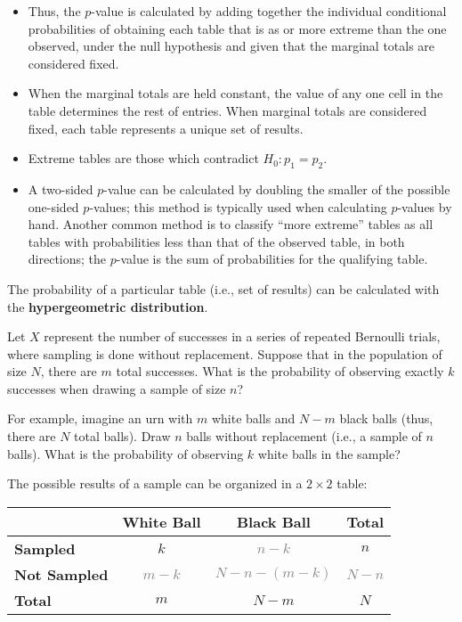 \documentclass[letterpaper,12pt,twoside,]{pinp}
\begin{document}
\begin{itemize}
\item
  Thus, the \(p\)-value is calculated by adding together the individual
  conditional probabilities of obtaining each table that is as or more
  extreme than the one observed, under the null hypothesis and given
  that the marginal totals are considered fixed.
\item
  When the marginal totals are held constant, the value of any one cell
  in the table determines the rest of entries. When marginal totals are
  considered fixed, each table represents a unique set of results.
\item
  Extreme tables are those which contradict \(H_0: p_1 = p_2\).
\item
  A two-sided \(p\)-value can be calculated by doubling the smaller of
  the possible one-sided \(p\)-values; this method is typically used
  when calculating \(p\)-values by hand. Another common method is to
  classify ``more extreme'' tables as all tables with probabilities less
  than that of the observed table, in both directions; the \(p\)-value
  is the sum of probabilities for the qualifying table.
\end{itemize}

The probability of a particular table (i.e., set of results) can be
calculated with the \textbf{hypergeometric distribution}.

Let \(X\) represent the number of successes in a series of repeated
Bernoulli trials, where sampling is done without replacement. Suppose
that in the population of size \(N\), there are \(m\) total successes.
What is the probability of observing exactly \(k\) successes when
drawing a sample of size \(n\)?

For example, imagine an urn with \(m\) white balls and \(N - m\) black
balls (thus, there are \(N\) total balls). Draw \(n\) balls without
replacement (i.e., a sample of \(n\) balls). What is the probability of
observing \(k\) white balls in the sample?

The possible results of a sample can be organized in a \(2 \times 2\)
table:

\begin{table*}[h!]
\begin{center}
\begin{tabular}{l|cc|c} 
   & \textbf{White Ball} & \textbf{Black Ball} & \textbf{Total}\\ \hline
  \textbf{Sampled} & $k$ & \textcolor{gray}{$n - k$}  & $n$  \\
  \textbf{Not Sampled} & \textcolor{gray}{$m - k$} & \textcolor{gray}{$N - n - (m - k)$} & \textcolor{gray}{$N - n$} \\ \hline
  \textbf{Total} & $m$ & $N - m$ & $N$  \\ 
\end{tabular}\\
\end{center}
\end{table*}
\end{document}
